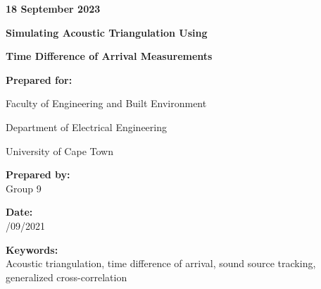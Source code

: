 \documentclass[a4paper,11pt]{article}
\begin{document}
\begin{titlepage}
	\vspace{0.809cm}
	
	{\bfseries 18 September 2023\\}
	
	\vspace{4.80cm}
	
	{\LARGE\bfseries Simulating Acoustic Triangulation Using} 
	
	\vspace{0.189cm}
	
	{\LARGE\bfseries Time Difference of Arrival Measurements}
	
	\vspace{0.189cm}
	
	{\Large\bfseries Prepared for:\\}
	
	\vspace{0.809cm}
	{\text  Faculty of Engineering and Built Environment\\}
	
	\vspace{0.189cm}
	
	{\text Department of Electrical Engineering\\}
	
	\vspace{0.189cm}
	
	{\text University of Cape Town}
	
	\vspace{3.30cm}
	
	{\Large\bfseries Prepared by:\\}
	\vspace{0.809cm}
	{\text Group 9}
	
	\vspace{3.30cm}
	
	{\Large\bfseries Date:\\}
	\vspace{0.809cm}
	{/09/2021} 
	
	\vspace{3.30cm}
	
	{\Large\bfseries Keywords:\\}
	\vspace{0.809cm}
	{\text Acoustic triangulation, time difference of arrival, sound source tracking, generalized cross-correlation}
	
\end{titlepage}
\newpage


\end{document}
